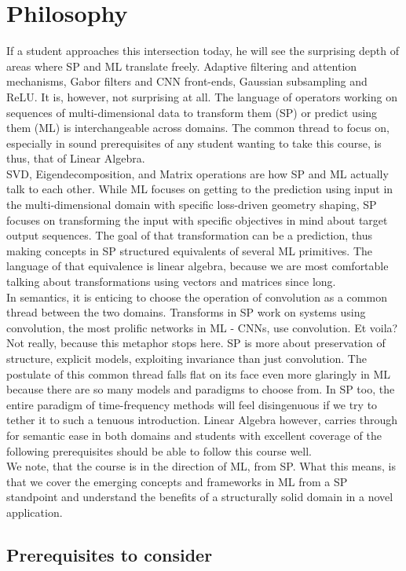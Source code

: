 \documentclass[12pt]{article}
\begin{document}
\section{Philosophy}
If a student approaches this intersection today, he will see the surprising depth of areas where SP and ML translate freely. Adaptive filtering and attention mechanisms, Gabor filters and CNN front-ends, Gaussian subsampling and ReLU. It is, however, not surprising at all. The language of operators working on sequences of multi-dimensional data to transform them (SP) or predict using them (ML) is interchangeable across domains. The common thread to focus on, especially in sound prerequisites of any student wanting to take this course, is thus, that of Linear Algebra. \\
SVD, Eigendecomposition, and Matrix operations are how SP and ML actually talk to each other. While ML focuses on getting to the prediction using input in the multi-dimensional domain with specific loss-driven geometry shaping, SP focuses on transforming the input with specific objectives in mind about target output sequences. The goal of that transformation can be a prediction, thus making concepts in SP structured equivalents of several ML primitives. The language of that equivalence is linear algebra, because we are most comfortable talking about transformations using vectors and matrices since long. \\
In semantics, it is enticing to choose the operation of convolution as a common thread between the two domains. Transforms in SP work on systems using convolution, the most prolific networks in ML - CNNs, use convolution. Et voila? Not really, because this metaphor stops here. SP is more about preservation of structure, explicit models, exploiting invariance than just convolution. The postulate of this common thread falls flat on its face even more glaringly in ML because there are so many models and paradigms to choose from. In SP too, the entire paradigm of time-frequency methods will feel disingenuous if we try to tether it to such a tenuous introduction. Linear Algebra however, carries through for semantic ease in both domains and students with excellent coverage of the following prerequisites should be able to follow this course well. \\
We note, that the course is in the direction of ML, from SP. What this means, is that we cover the emerging concepts and frameworks in ML from a SP standpoint and understand the benefits of a structurally solid domain in a novel application.
\subsection{Prerequisites to consider}
\end{document}
